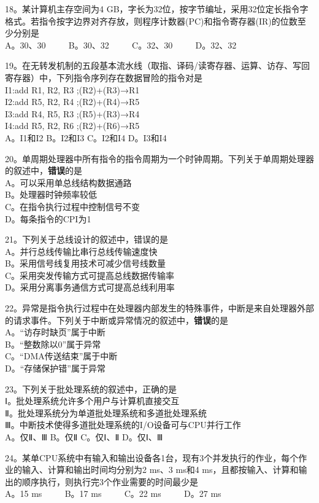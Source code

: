 18。某计算机主存空间为4 GB，字长为32位，按字节编址，采用32位定长指令字格式。若指令按字边界对齐存放，则程序计数器(PC)和指令寄存器(IR)的位数至少分别是 \\
A。30、30 $\qquad$ B。30、32 $\qquad$ C。32、30 $\qquad$ D。32、32

19。在无转发机制的五段基本流水线（取指、译码/读寄存器、运算、访存、写回寄存器）中，下列指令序列存在数据冒险的指令对是 \\
I1:add R1, R2, R3 ;(R2)+(R3)→R1 \\
I2:add R5, R2, R4 ;(R2)+(R4)→R5 \\
I3:add R4, R5, R3 ;(R5)+(R3)→R4 \\
I4:add R5, R2, R6 ;(R2)+(R6)→R5 \\
A。I1和I2 B。I2和I3 C。I2和I4 D。I3和I4

20。单周期处理器中所有指令的指令周期为一个时钟周期。下列关于单周期处理器的叙述中，\textbf{错误}的是 \\
A。可以采用单总线结构数据通路 \\
B。处理器时钟频率较低 \\
C。在指令执行过程中控制信号不变 \\
D。每条指令的CPI为1

21。下列关于总线设计的叙述中，错误的是 \\
A。并行总线传输比串行总线传输速度快 \\
B。采用信号线复用技术可减少信号线数量 \\
C。采用突发传输方式可提高总线数据传输率 \\
D。采用分离事务通信方式可提高总线利用率

22。异常是指令执行过程中在处理器内部发生的特殊事件，中断是来自处理器外部的请求事件。下列关于中断或异常情况的叙述中，\textbf{错误}的是 \\
A。“访存时缺页”属于中断 \\
B。“整数除以0”属于异常 \\
C。“DMA传送结束”属于中断 \\
D。“存储保护错”属于异常

23。下列关于批处理系统的叙述中，正确的是 \\
Ⅰ。批处理系统允许多个用户与计算机直接交互 \\
Ⅱ。批处理系统分为单道批处理系统和多道批处理系统 \\
Ⅲ。中断技术使得多道批处理系统的I/O设备可与CPU并行工作 \\
A。仅Ⅱ、Ⅲ B。仅Ⅱ C。仅Ⅰ、Ⅱ D。仅Ⅰ、Ⅲ

24。某单CPU系统中有输入和输出设备各1台，现有3个并发执行的作业，每个作业的输入、计算和输出时间均分别为2 ms、3 ms和4 ms，且都按输入、计算和输出的顺序执行，则执行完3个作业需要的时间最少是 \\
A。15 ms $\qquad$ B。17 ms $\qquad$ C。22 ms $\qquad$ D。27 ms


